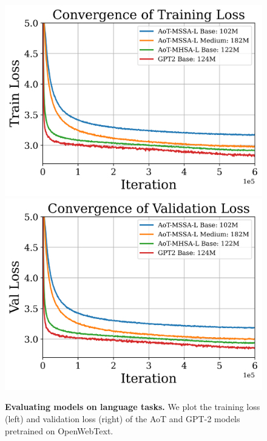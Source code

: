 \documentclass[../../book-main.tex]{subfiles}
\begin{document}
\begin{figure}[t]
\begin{center}
\includegraphics[width=0.4\linewidth]{figs/training_loss.png} \hspace{0.4in}
\includegraphics[width = 0.4\linewidth]{figs/val_loss.png}
    \vspace{-0.15in}
\caption{\centering \textbf{Evaluating models on language tasks.} We plot the training loss (left) and validation loss (right) of the AoT and GPT-2 models pretrained on OpenWebText.}  \label{fig:loss} 
\end{center}
\vspace{-0.15in}
\end{figure} 



\end{document}
